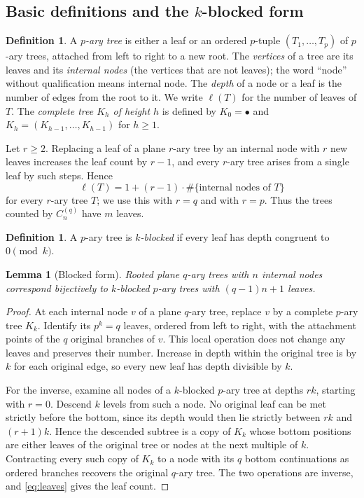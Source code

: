 \documentclass[11pt]{amsart}
\newtheorem{lemma}[theorem]{Lemma}
\theoremstyle{definition}
\newtheorem{definition}[theorem]{Definition}
\theoremstyle{remark}
\newcommand{\fc}{C_n^{(q)}}
\begin{document}
\subsection{Basic definitions and the \texorpdfstring{$k$}{k}-blocked form}
\begin{definition}
A \emph{$p$-ary tree} is either a leaf or an ordered $p$-tuple $(T_1,\ldots,T_p)$ of $p$-ary trees, attached from left to right to a new root.  The \emph{vertices} of a tree are its leaves and its \emph{internal nodes} (the vertices that are not leaves); the word ``node'' without qualification means internal node.  The \emph{depth} of a node or a leaf is the number of edges from the root to it.  We write $\ell(T)$ for the number of leaves of $T$.  The \emph{complete tree $K_h$ of height $h$} is defined by $K_0=\bullet$ and $K_h=(K_{h-1},\ldots,K_{h-1})$ for $h\ge1$.
\end{definition}
Let $r\ge2$.  Replacing a leaf of a plane $r$-ary tree by an internal node with $r$ new leaves increases the leaf count by $r-1$, and every $r$-ary tree arises from a single leaf by such steps.  Hence
\begin{equation}\label{eq:leaves}
 \ell(T)=1+(r-1)\cdot\#\{\text{internal nodes of }T\}
\end{equation}
for every $r$-ary tree $T$; we use this with $r=q$ and with $r=p$.  Thus the trees counted by $\fc$ have $m$ leaves.
\begin{definition}
A $p$-ary tree is \emph{$k$-blocked} if every leaf has depth congruent to $0\pmod k$.
\end{definition}
\begin{lemma}[Blocked form]\label{lem:blocked}
Rooted plane $q$-ary trees with $n$ internal nodes correspond bijectively to $k$-blocked $p$-ary trees with $(q-1)n+1$ leaves.
\end{lemma}
\begin{proof}
At each internal node $v$ of a plane $q$-ary tree, replace $v$ by a complete $p$-ary tree $K_k$.  Identify its $p^k=q$ leaves, ordered from left to right, with the attachment points of the $q$ original branches of $v$.  This local operation does not change any leaves and preserves their number.  Increase in depth within the original tree is by $k$ for each original edge, so every new leaf has depth divisible by $k$.

For the inverse, examine all nodes of a $k$-blocked $p$-ary tree at depths $rk$, starting with $r=0$.  Descend $k$ levels from such a node.  No original leaf can be met strictly before the bottom, since its depth would then lie strictly between $rk$ and $(r+1)k$.  Hence the descended subtree is a copy of $K_k$ whose bottom positions are either leaves of the original tree or nodes at the next multiple of $k$.  Contracting every such copy of $K_k$ to a node with its $q$ bottom continuations as ordered branches recovers the original $q$-ary tree.  The two operations are inverse, and \eqref{eq:leaves} gives the leaf count.
\end{proof}
\end{document}
